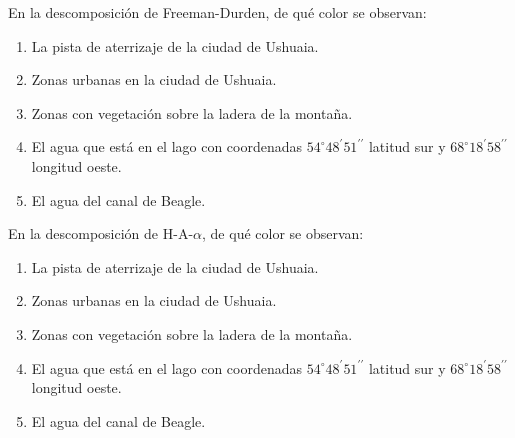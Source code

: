 \begin{que}
    En la descomposición de Freeman-Durden, de qué color  se observan:
    \begin{enumerate}
        \item La pista de aterrizaje de la ciudad de Ushuaia.
        \item Zonas urbanas en la ciudad de Ushuaia.
        \item Zonas con vegetación sobre la ladera de la montaña.
        \item El agua que está en el lago con coordenadas $54^\circ 48^\prime 51^{\prime\prime}$ latitud sur y $68^\circ 18^\prime 58^{\prime\prime}$ longitud oeste.
        \item El agua del canal de Beagle.
    \end{enumerate}
\end{que}

\begin{que}
    En la descomposición de H-A-$\alpha$, de qué color  se observan:
    \begin{enumerate}
        \item La pista de aterrizaje de la ciudad de Ushuaia.
        \item Zonas urbanas en la ciudad de Ushuaia.
        \item Zonas con vegetación sobre la ladera de la montaña.
        \item El agua que está en el lago con coordenadas $54^\circ 48^\prime 51^{\prime\prime}$ latitud sur y $68^\circ 18^\prime 58^{\prime\prime}$ longitud oeste.
        \item El agua del canal de Beagle.
    \end{enumerate}
\end{que}
